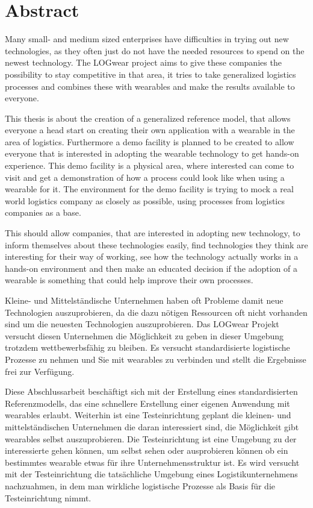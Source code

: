 \chapter*{Abstract}
Many small- and medium sized enterprises have difficulties in trying out new technologies, as they often just do not have the needed resources to spend on the newest technology. The LOGwear project aims to give these companies the possibility to stay competitive in that area, it tries to take generalized logistics processes and combines these with wearables and make the results available to everyone.

This thesis is about the creation of a generalized reference model, that allows everyone a head start on creating their own application with a wearable in the area of logistics. Furthermore a demo facility is planned to be created to allow everyone that is interested  in adopting the wearable technology to get hands-on experience. This demo facility is a physical area, where interested can come to visit and get a demonstration of how a process could look like when using a wearable for it. The environment for the demo facility is trying to mock a real world logistics company as closely as possible, using processes from logistics companies as a base.

This should allow companies, that are interested in adopting new technology, to inform themselves about these technologies easily, find technologies they think are interesting for their way of working, see how the technology actually works in a hands-on environment and then make an educated decision if the adoption of a wearable is something that could help improve their own processes.

\vspace{2cm}

Kleine- und Mittelständische Unternehmen haben oft Probleme damit neue Technologien auszuprobieren, da die dazu nötigen Ressourcen oft nicht vorhanden sind um die neuesten Technologien auszuprobieren. Das LOGwear Projekt versucht diesen Unternehmen die Möglichkeit zu geben in dieser Umgebung trotzdem wettbewerbsfähig zu bleiben. Es versucht standardisierte logistische Prozesse zu nehmen und Sie mit wearables zu verbinden und stellt die Ergebnisse frei zur Verfügung.

Diese Abschlussarbeit beschäftigt sich mit der Erstellung eines standardisierten Referenzmodells, das eine schnellere Erstellung einer eigenen Anwendung mit wearables erlaubt. Weiterhin ist eine Testeinrichtung geplant die kleinen- und mittelständischen Unternehmen die daran interessiert sind, die Möglichkeit gibt  wearables selbst auszuprobieren. Die Testeinrichtung ist eine Umgebung zu der interessierte gehen können, um selbst sehen oder ausprobieren können ob ein bestimmtes wearable etwas für ihre Unternehmensstruktur ist. Es wird versucht mit der Testeinrichtung die tatsächliche Umgebung eines Logistikunternehmens nachzuahmen, in dem man wirkliche logistische Prozesse als Basis für die Testeinrichtung nimmt.

